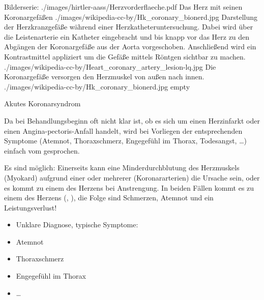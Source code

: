 \begin{PictureSeriesWide}{}{Bilderserie:
}
{./images/hirtler-aass/Herzvorderflaeche.pdf}
{Das Herz mit seinen Koronargefäßen }
{./images/wikipedia-cc-by/Hk_coronary_bionerd.jpg}
{Darstellung der
Herzkranzgefäße während einer Herzkatheteruntersuchung.
Dabei wird über die Leistenarterie ein Katheter
eingebracht und bis knapp vor das Herz zu den Abgängen der
Koronargefäße aus der Aorta vorgeschoben. Anschließend wird ein
Kontrastmittel appliziert um die Gefäße mittels Röntgen sichtbar zu machen.
}
{./images/wikipedia-cc-by/Heart_coronary_artery_lesion-lq.jpg}
{Die Koronargefäße versorgen den
Herzmuskel von außen nach innen. }
{./images/wikipedia-cc-by/Hk_coronary_bionerd.jpg}
{empty}
{}

\end{PictureSeriesWide}

\TextSlide
{Akutes Koronarsyndrom}
{%
Da bei Behandlungsbeginn oft nicht klar ist, ob es sich um
einen Herzinfarkt oder einen Angina-pectoris-Anfall handelt,
wird bei Vorliegen der entsprechenden Symptome (Atemnot,
Thoraxschmerz, Engegefühl im Thorax, 
Todesangst, \ldots) einfach vom  gesprochen. 

Es sind  möglich:
Einerseits kann eine Minderdurchblutung des Herzmuskels
(Myokard)
  aufgrund einer oder mehrerer  (Koronararterien) die Ursache sein, oder
es kommt zu einem  des Herzens
bei
  Anstrengung.
In beiden Fällen kommt es zu einem  des
Herzens (,
), die Folge sind Schmerzen,
Atemnot und ein Leistungsverlust!
}
{%
\begin{itemize}
  \item Unklare Diagnose, typische Symptome:
\end{itemize}
\begin{itemize}
  \item Atemnot
  \item Thoraxschmerz
  \item Engegefühl im Thorax
  \item \ldots
\end{itemize}
}


